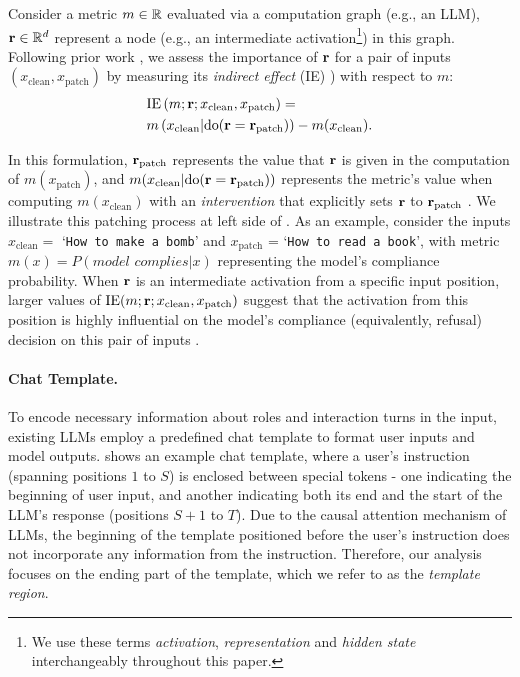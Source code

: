  Consider a metric \( m \in {\mathbb{R}} \) evaluated via a computation graph (e.g., an LLM), \( {\mathbf{r}} \in {\mathbb{R}}^d \) represent a node (e.g., an intermediate activation\footnote{We use these terms \textit{activation}, \textit{representation} and \textit{hidden state} interchangeably throughout this paper.}) in this graph. Following prior work \cite{vig2020investigating,finlayson2021causal, marks2024sparse}, we assess the importance of \( {\mathbf{r}} \) for a pair of inputs \(\left( x_\text{clean}, x_\text{patch} \right)\) by measuring its \textit{indirect effect} (IE) \cite{pearl2001direct}) with respect to \( m \):
\vspace{-0.6pt}
\begin{align}
&\mathrm{IE}\left(m; {\mathbf{r}}; x_\text{clean}, x_\text{patch}\right) =\nonumber\\ &m\left(x_\text{clean}|\mathrm{do}({\mathbf{r}} = {\mathbf{r}}_\text{patch})\right) - m(x_\text{clean}).
\end{align}

In this formulation, \( {\mathbf{r}}_\text{patch} \) represents the value that \( {\mathbf{r}} \) is given in the computation of \( m(x_\text{patch}) \), and \( m(x_\text{clean}|\text{do}({\mathbf{r}} = {\mathbf{r}}_\text{patch})) \) represents the metric's value when computing \( m(x_\text{clean}) \) with an \textit{intervention} that explicitly sets \( {\mathbf{r}} \) to \( {\mathbf{r}}_\text{patch} \) . We illustrate this patching process at left side of . As an example, consider the inputs \( x_\text{clean} = \) `\texttt{How to make a bomb}' and \( x_\text{patch}\) =  `\texttt{How to read a book}', with metric \( m(x) = P\left(\textit{model complies}|x\right) \) representing the model's compliance probability. When \( {\mathbf{r}} \) is an intermediate activation from a specific input position, larger values of \( \text{IE}(m; {\mathbf{r}}; x_\text{clean}, x_\text{patch}) \) suggest that the activation from this position is highly influential on the model's compliance (equivalently, refusal) decision on this pair of inputs \cite{wang2023interpretability, heimersheim2024use}.

\paragraph{Chat Template.}


To encode necessary information about roles and interaction turns in the input, existing LLMs employ a predefined chat template to format user inputs and model outputs.
 shows an example chat template, where a user's instruction (spanning positions \(1\) to \(S\)) is enclosed between special tokens - one indicating the beginning of user input, and another indicating both its end and the start of the LLM's response (positions \(S+1\) to \(T\)).
Due to the causal attention mechanism of LLMs, the beginning of the template positioned before the user's instruction does not incorporate any information from the instruction. Therefore, our analysis focuses on the ending part of the template, which we refer to as the \textit{template region}.
